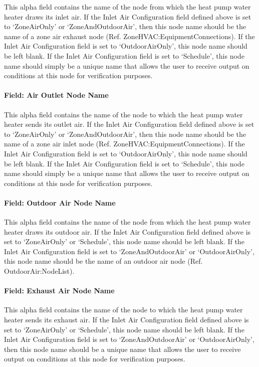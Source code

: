 This alpha field contains the name of the node from which the heat pump water heater draws its inlet air. If the Inlet Air Configuration field defined above is set to `ZoneAirOnly' or `ZoneAndOutdoorAir', then this node name should be the name of a zone air exhaust node (Ref. ZoneHVAC:EquipmentConnections). If the Inlet Air Configuration field is set to `OutdoorAirOnly', this node name should be left blank. If the Inlet Air Configuration field is set to `Schedule', this node name should simply be a unique name that allows the user to receive output on conditions at this node for verification purposes.

\paragraph{Field: Air Outlet Node Name}\label{field-air-outlet-node-name-007}

This alpha field contains the name of the node to which the heat pump water heater sends its outlet air. If the Inlet Air Configuration field defined above is set to `ZoneAirOnly' or `ZoneAndOutdoorAir', then this node name should be the name of a zone air inlet node (Ref. ZoneHVAC:EquipmentConnections). If the Inlet Air Configuration field is set to `OutdoorAirOnly', this node name should be left blank. If the Inlet Air Configuration field is set to `Schedule', this node name should simply be a unique name that allows the user to receive output on conditions at this node for verification purposes.

\paragraph{Field: Outdoor Air Node Name}\label{field-outdoor-air-node-name-000}

This alpha field contains the name of the node from which the heat pump water heater draws its outdoor air. If the Inlet Air Configuration field defined above is set to `ZoneAirOnly' or `Schedule', this node name should be left blank. If the Inlet Air Configuration field is set to `ZoneAndOutdoorAir' or `OutdoorAirOnly', this node name should be the name of an outdoor air node (Ref. OutdoorAir:NodeList).

\paragraph{Field: Exhaust Air Node Name}\label{field-exhaust-air-node-name}

This alpha field contains the name of the node to which the heat pump water heater sends its exhaust air. If the Inlet Air Configuration field defined above is set to `ZoneAirOnly' or `Schedule', this node name should be left blank. If the Inlet Air Configuration field is set to `ZoneAndOutdoorAir' or `OutdoorAirOnly', then this node name should be a unique name that allows the user to receive output on conditions at this node for verification purposes.

